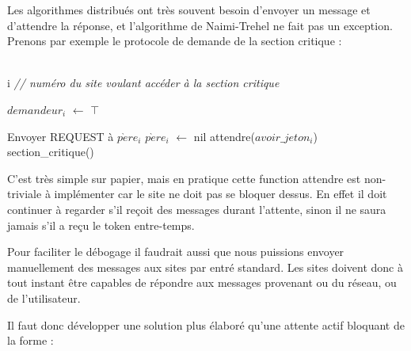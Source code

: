 Les algorithmes distribués ont très souvent besoin d'envoyer un message et d'attendre la réponse, et l'algorithme de Naimi-Trehel ne fait pas un exception. Prenons par exemple le protocole de demande de la section critique :

\begin{algorithm}[H]
  \caption{$Supplier_i$()}
  \label{nt_wait}
  \Donnees
  {\\
    i \textit{// numéro du site voulant accéder à la section critique}\\
  }
  \Deb
  {
  	$demandeur_i$ $\leftarrow$ $\top$ \;
  	
  	{
  		Envoyer REQUEST à $p\grave{e}re_i$ \;
  		$p\grave{e}re_i$ $\leftarrow$ nil \;
  	}
	attendre($avoir\_jeton_i$) \;
  	section\_critique() \;

  }	
\end{algorithm}

C'est très simple sur papier, mais en pratique cette function \og attendre \fg{} est non-triviale à implémenter car le site ne doit pas se bloquer dessus. En effet il doit continuer à regarder s'il reçoit des messages durant l'attente, sinon il ne saura jamais s'il a reçu le token entre-temps.

Pour faciliter le débogage il faudrait aussi que nous puissions envoyer manuellement des messages aux sites par entré standard. Les sites doivent donc à tout instant être capables de répondre aux messages provenant ou du réseau, ou de l'utilisateur.
 
Il faut donc développer une solution plus élaboré qu'une attente actif bloquant de la forme :

 
